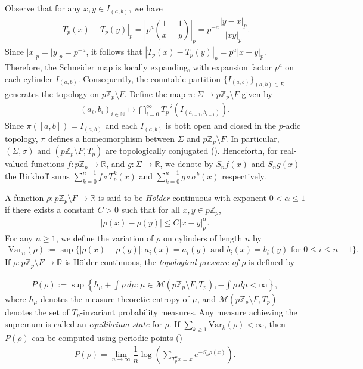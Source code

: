 \documentclass[11pt]{amsart}
\theoremstyle{remark}
\numberwithin{equation}{section}
\newcommand{\N}{\mathbb{N}}
\newcommand{\R}{\mathbb{R}}
\newcommand{\Z}{\mathbb{Z}}
\newcommand{\Zp}{\mathbb{Z}_p}
\begin{document}
Observe that for any $x,y\in I_{(a,b)}$, we have 
\begin{align}\label{Equation1}
    \left|T_{p}(x)-T_{p}(y)\right|_{p}=\left|p^{a}\left(\dfrac{1}{x}-\dfrac{1}{y}\right)\right|_{p}=p^{-a}\dfrac{|y-x|_{p}}{|xy|_{p}}.
\end{align}
Since $|x|_{p}=|y|_{p}=p^{-a}$, it follows that $\left|T_{p}(x)-T_{p}(y)\right|_{p}=p^{a}|x-y|_{p}$. Therefore, the Schneider map is locally expanding, with expansion factor $p^{a}$ on each cylinder $I_{(a,b)}$. Consequently, the countable partition $\{I_{(a,b)}\}_{(a,b)\in E}$ generates the topology on $p\Z_p\setminus F$. Define the map $\pi:\Sigma\to p\Z_p\setminus F$ given by
\begin{align*}
    (a_{i},b_{i})_{i\in \N}\mapsto \bigcap_{i=0}^{\infty}T_{p}^{-i}\left(I_{(a_{i+1},b_{i+1})}\right).
\end{align*}
Since {$\pi\left([a,b]\right)=I_{(a,b)}$} and each $I_{(a,b)}$ is both open and closed in the $p$-adic topology, $\pi$ defines a homeomorphism between $\Sigma$ and $p\Zp\setminus F$. In particular, $(\Sigma,\sigma)$ and $(p\Zp\setminus F,T_{p})$ are topologically conjugated (\cite{walters2000introduction}). 
Henceforth, for real-valued functions $f\colon p\Z_p\to \R$, and $g\colon \Sigma\to \R$, we denote by $S_n f(x)$ and $S_n g(x)$ the Birkhoff sums $\sum_{k=0}^{n-1} f\circ T_p^k(x)$ and $\sum_{k=0}^{n-1} g\circ \sigma^k(x)$ respectively.

A function $\rho:p\Z_{p}\setminus F\rightarrow \R$ is said to be \textit{H\"older} continuous with exponent $0<\alpha \leq 1$ if there exists a constant $C>0$ such that for all $x,y\in p\Zp$,
\begin{align*}
    |\rho(x)-\rho(y)|\leq C|x-y|^\alpha_{p}.
\end{align*}
For any $n\geq 1$, we define the variation of $\rho$ on cylinders of length $n$ by
\begin{align*}
 \mathrm{Var}_{n}(\rho):=\sup\{|\rho(x)-\rho(y)|:a_{i}(x)=a_{i}(y) \text{ and $b_{i}(x)=b_{i}(y)$ for $0\leq i\leq n-1$}\}.
\end{align*} 
If $\rho:p\Zp \setminus F\to \mathbb{R}$ is H\"older continuous, 
the \emph{topological pressure of $\rho$} is defined by  

\begin{align}\label{DefPressure}
    P(\rho) := \sup \left\{ h_{\mu} + \int \rho \, d\mu : \mu \in \mathcal{M}(p\Zp\setminus F,T_{p}), -\int \rho \, d\mu < \infty \right\},
\end{align}where \( h_{\mu} \) denotes the measure-theoretic entropy of \( \mu \), and \( \mathcal{M}(p\Zp\setminus F,T_{p}) \) denotes the set of \( T_{p} \)-invariant probability measures. Any measure achieving the supremum is called an \textit{equilibrium state} for \( \rho\). If $\sum_{k\geq 1}\mathrm{Var}_{k}(\rho)<\infty$, then $P(\rho)$ can be computed using periodic points (\cite[Cor. 1]{bs})
\begin{align}\label{EcuPressure}
    P(\rho)=\lim_{n\rightarrow \infty}\dfrac{1}{n}\log\left(\sum_{T_{p}^{n}x=x}e^{-S_{n} \rho(x)}\right).
\end{align}
\end{document}
